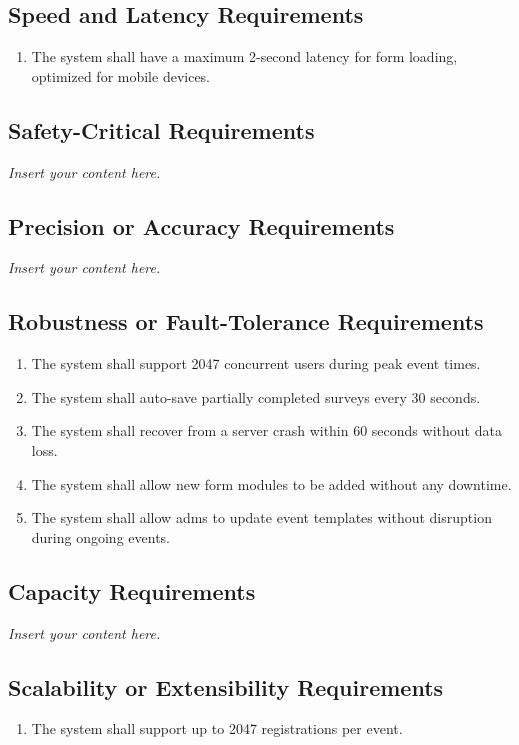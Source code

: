 \documentclass[12pt]{article}
\newcommand{\lips}{\textit{Insert your content here.}}
\begin{document}
\subsection{Speed and Latency Requirements}
\begin{enumerate}[align=left,
  leftmargin=*,
  labelsep=1em,
  itemindent=0em,
  label=\bfseries SL-\arabic*:]
  \item The system shall have a maximum 2-second latency for form loading, optimized for
    mobile devices.
\end{enumerate}
\subsection{Safety-Critical Requirements}
\lips
\subsection{Precision or Accuracy Requirements}
\lips
\subsection{Robustness or Fault-Tolerance Requirements}
\begin{enumerate}[align=left,
  leftmargin=*,
  labelsep=1em,
  itemindent=0em,
  label=\bfseries RF-\arabic*:]
  \item The system shall support 2047 concurrent users during peak event times.
  \item The system shall auto-save partially completed surveys every 30 seconds.
  \item The system shall recover from a server crash within 60 seconds without data loss.
  \item The system shall allow new form modules to be added without any downtime.
  \item The system shall allow \glspl{adm} to update event templates without disruption
    during ongoing events.
\end{enumerate}
\subsection{Capacity Requirements}
\lips
\subsection{Scalability or Extensibility Requirements}
\begin{enumerate}[align=left,
  leftmargin=*,
  labelsep=1em,
  itemindent=0em,
  label=\bfseries SE-\arabic*:]
  \item The system shall support up to 2047 registrations per event.
\end{enumerate}
\end{document}
